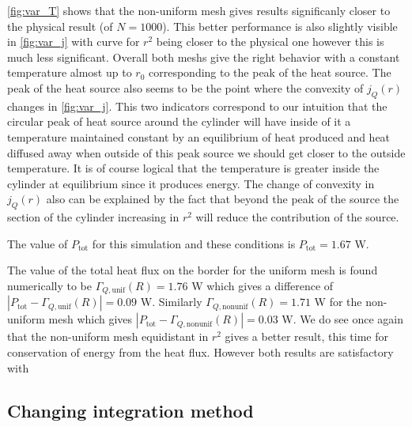 \autoref{fig:var_T} shows that the non-uniform mesh gives results significanly closer to the physical result (of $N=1000$). This better performance is also slightly visible in \autoref{fig:var_j} with curve for $r^2$ being closer to the physical one however this is much less significant. Overall both meshs give the right behavior with a constant temperature almost up to $r_0$ corresponding to the peak of the heat source. The peak of the heat source also seems to be the point where the convexity of $j_Q(r)$ changes in \autoref{fig:var_j}. This two indicators correspond to our intuition that the circular peak of heat source around the cylinder will have inside of it a temperature maintained constant by an equilibrium of heat produced and heat diffused away when outside of this peak source we should get closer to the outside temperature. It is of course logical that the temperature is greater inside the cylinder at equilibrium since it produces energy. The change of convexity in $j_Q(r)$ also can be explained by the fact that beyond the peak of the source the section of the cylinder increasing in $r^2$ will reduce the contribution of the source.

The value of $P_\mathrm{tot}$ for this simulation and these conditions is $P_\mathrm{tot} = 1.67$ \si{\watt}.

The value of the total heat flux on the border for the uniform mesh is found numerically to be $\Gamma_{Q, \mathrm{unif}}(R) = 1.76$ \si{\watt} which gives a difference of $|P_\mathrm{tot} - \Gamma_{Q, \mathrm{unif}}(R)| = 0.09$ \si{\watt}. Similarly $\Gamma_{Q, \mathrm{nonunif}}(R) = 1.71$ \si{\watt} for the non-uniform mesh which gives $|P_\mathrm{tot} - \Gamma_{Q, \mathrm{nonunif}}(R)| = 0.03$ \si{\watt}. We do see once again that the non-uniform mesh equidistant in $r^2$ gives a better result, this time for conservation of energy from the heat flux. However both results are satisfactory with 








\subsection{Changing integration method}

